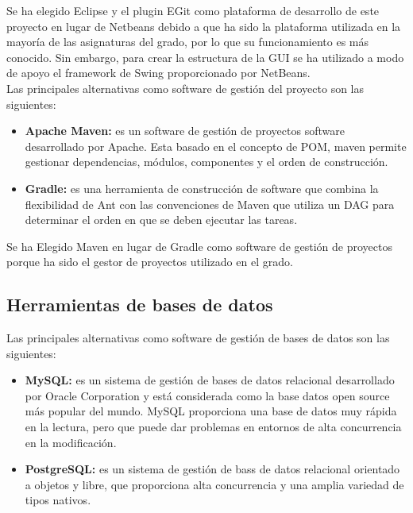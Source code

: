 \documentclass[12pt, a4paper]{book}
\begin{document}
Se ha elegido Eclipse y el plugin EGit como plataforma de desarrollo de este proyecto en lugar de Netbeans debido a que ha sido la plataforma utilizada en la mayoría de las asignaturas del grado, por lo que su funcionamiento es más conocido. Sin embargo, para crear la estructura de la \gls{GUI} se ha utilizado a modo de apoyo el framework de Swing proporcionado por NetBeans.\\

Las principales alternativas como software de gestión del proyecto son las siguientes:

\begin{itemize}
	
	\item \textbf{Apache Maven:} es un software de gestión de proyectos software desarrollado por Apache. Esta basado en el concepto de \gls{POM}, maven permite gestionar dependencias, módulos, componentes y el orden de construcción.
	
	\item \textbf{Gradle:} es una herramienta de construcción de software que combina la flexibilidad de Ant con las convenciones de Maven que utiliza un \gls{DAG} para determinar el orden en que se deben ejecutar las tareas.
	
\end{itemize}

Se ha Elegido Maven en lugar de Gradle como software de gestión de proyectos porque ha sido el gestor de proyectos utilizado en el grado.


\subsection{Herramientas de bases de datos}

Las principales alternativas como software de gestión de bases de datos son las siguientes:

\begin{itemize}
	\item \textbf{MySQL:} es un sistema de gestión de bases de datos relacional desarrollado por Oracle Corporation y está considerada como la base datos open source más popular del mundo. MySQL proporciona una base de datos muy rápida en la lectura, pero que puede dar problemas en entornos de alta concurrencia en la modificación.
	
	\newpage
	
	\item \textbf{PostgreSQL:} es un sistema de gestión de bass de datos relacional orientado a objetos y libre, que proporciona alta concurrencia y una amplia variedad de tipos nativos.
	
\end{itemize}	
\end{document}
